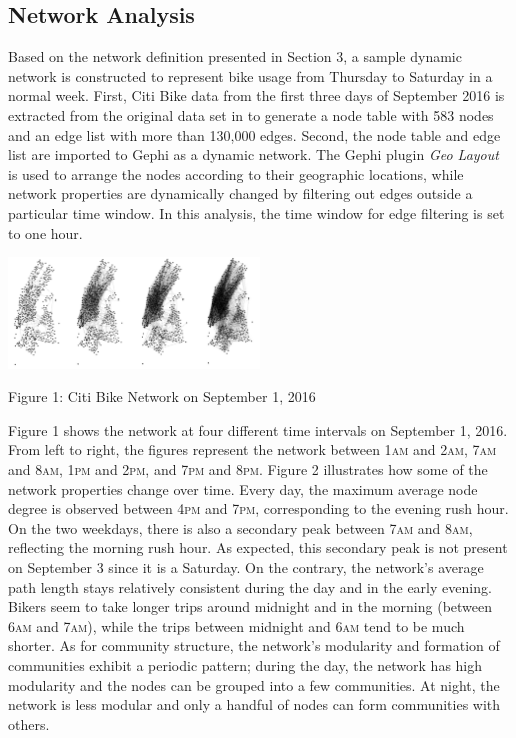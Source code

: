 \documentclass[times, 10pt,twocolumn]{article}
\begin{document}
\subsection{Network Analysis}
Based on the network definition presented in Section 3, a sample dynamic network is constructed to represent bike usage from Thursday to Saturday in a normal week. First, Citi Bike data from the first three days of September 2016 is extracted from the original data set in \cite{dataset} to generate a node table with 583 nodes and an edge list with more than 130,000 edges. Second, the node table and edge list are imported to Gephi as a dynamic network. The Gephi plugin \textit{Geo Layout} is used to arrange the nodes according to their geographic locations, while network properties are dynamically changed by filtering out edges outside a particular time window. In this analysis, the time window for edge filtering is set to one hour.\\

\centerline{\includegraphics[width=0.5\textwidth]{m2/combined.jpg}}
\centerline{Figure 1: Citi Bike Network on September 1, 2016}
\hfill \break
Figure 1 shows the network at four different time intervals on September 1, 2016. From left to right, the figures represent the network between 1\textsc{am} and 2\textsc{am}, 7\textsc{am} and 8\textsc{am}, 1\textsc{pm} and 2\textsc{pm}, and 7\textsc{pm} and 8\textsc{pm}. Figure 2 illustrates how some of the network properties change over time. Every day, the maximum average node degree is observed between 4\textsc{pm} and 7\textsc{pm}, corresponding to the evening rush hour. On the two weekdays, there is also a secondary peak between 7\textsc{am} and 8\textsc{am}, reflecting the morning rush hour. As expected, this secondary peak is not present on September 3 since it is a Saturday. On the contrary, the network's average path length stays relatively consistent during the day and in the early evening. Bikers seem to take longer trips around midnight and in the morning (between 6\textsc{am} and 7\textsc{am}), while the trips between midnight and 6\textsc{am} tend to be much shorter. As for community structure, the network's modularity and formation of communities exhibit a periodic pattern; during the day, the network has high modularity and the nodes can be grouped into a few communities. At night, the network is less modular and only a handful of nodes can form communities with others.
\end{document}
